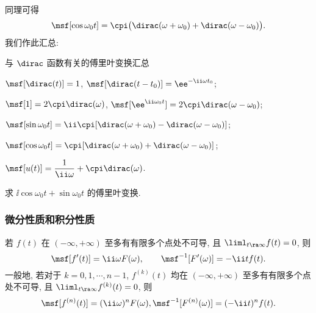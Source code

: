 同理可得
\[
  \msf[\cos{\omega_0 t}]
  =\cpi\bigl(\dirac(\omega+\omega_0)+\dirac(\omega-\omega_0)\bigr).
\]
我们作此汇总:
\begin{fifth}{与 $\dirac$ 函数有关的傅里叶变换汇总}
  \begin{enuma}
    \item $\msf[\dirac(t)]=1$, $\msf[\dirac(t-t_0)]=\ee^{-\ii \omega t_0}$;
    \item $\msf[1]=2\cpi\dirac(\omega)$, $\msf[\ee^{\ii \omega_0 t}]=2\cpi\dirac(\omega-\omega_0)$;
    \item $\msf[\sin \omega_0t]=\ii \cpi[\dirac(\omega+\omega_0)-\dirac(\omega-\omega_0)]$;
    \item $\msf[\cos{\omega_0 t}]=\cpi[\dirac(\omega+\omega_0)+\dirac(\omega-\omega_0)]$;
    \item $\msf[u(t)]=\dfrac1{\ii \omega}+\cpi\dirac(\omega)$.
  \end{enuma}
\end{fifth}







\begin{exercise}
  求 $\ii\cos{\omega_0 t}+\sin{\omega_0 t}$ 的傅里叶变换.
\end{exercise}


\subsubsection{微分性质和积分性质}

\begin{theorem}[微分性质]
  \label{thm:fourier-differential-property}
  若 $f(t)$ 在 $(-\infty,+\infty)$ 至多有有限多个点处不可导, 且 $\liml_{t\ra\infty}f(t)=0$, 则\footnotemark
  \[
    \msf[f'(t)]=\ii \omega F(\omega),\qquad
    \msf^{-1}[F'(\omega)]=-\ii tf(t).
  \]
  一般地, 若对于 $k=0,1,\cdots,n-1$, $f^{(k)}(t)$ 均在 $(-\infty,+\infty)$ 至多有有限多个点处不可导, 且 $\liml_{t\ra\infty}f^{(k)}(t)=0$, 则
  \[
    \msf[f^{(n)}(t)]=(\ii \omega)^n F(\omega),
    \msf^{-1}[F^{(n)}(\omega)]=(-\ii t)^nf(t).
  \]
\end{theorem}

